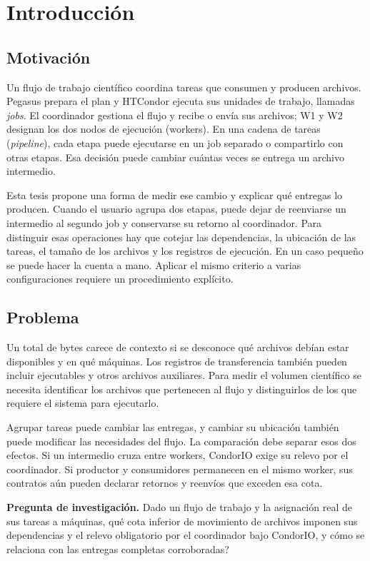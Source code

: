 \chapter{Introducción}
\section{Motivación}
Un flujo de trabajo científico coordina tareas que consumen y producen archivos. Pegasus prepara el plan y HTCondor ejecuta sus unidades de trabajo, llamadas \textit{jobs}. El coordinador gestiona el flujo y recibe o envía sus archivos; W1 y W2 designan los dos nodos de ejecución (workers). En una cadena de tareas (\textit{pipeline}), cada etapa puede ejecutarse en un job separado o compartirlo con otras etapas. Esa decisión puede cambiar cuántas veces se entrega un archivo intermedio.

Esta tesis propone una forma de medir ese cambio y explicar qué entregas lo producen. Cuando el usuario agrupa dos etapas, puede dejar de reenviarse un intermedio al segundo job y conservarse su retorno al coordinador. Para distinguir esas operaciones hay que cotejar las dependencias, la ubicación de las tareas, el tamaño de los archivos y los registros de ejecución. En un caso pequeño se puede hacer la cuenta a mano. Aplicar el mismo criterio a varias configuraciones requiere un procedimiento explícito.

\section{Problema}
Un total de bytes carece de contexto si se desconoce qué archivos debían estar disponibles y en qué máquinas. Los registros de transferencia también pueden incluir ejecutables y otros archivos auxiliares. Para medir el volumen científico se necesita identificar los archivos que pertenecen al flujo y distinguirlos de los que requiere el sistema para ejecutarlo.

Agrupar tareas puede cambiar las entregas, y cambiar su ubicación también puede modificar las necesidades del flujo. La comparación debe separar esos dos efectos. Si un intermedio cruza entre workers, CondorIO exige su relevo por el coordinador. Si productor y consumidores permanecen en el mismo worker, sus contratos aún pueden declarar retornos y reenvíos que exceden esa cota.

\textbf{Pregunta de investigación.} Dado un flujo de trabajo y la asignación real de sus tareas a máquinas, \textquestiondown{}qué cota inferior de movimiento de archivos imponen sus dependencias y el relevo obligatorio por el coordinador bajo CondorIO, y cómo se relaciona con las entregas completas corroboradas?

